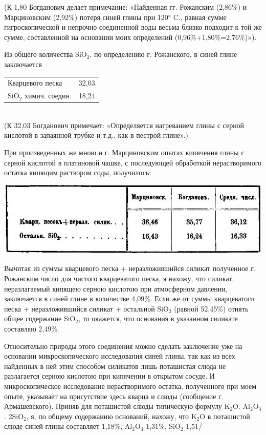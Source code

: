 (К 1,80 Богданович делает примечание: «Найденная гг. Рожанским (2,86\%) и Марциновским (2,92\%) потеря синей глины при 120° C., равная сумме гигроскопической и непрочно соединенной воды весьма близко подходит к той же сумме, составленной на основании моих определений (0,96\%+1,80\%=2,76\%)»).

Из общего количества SiO$_2$, по определению г. Рожанского, в синей глине заключается\\

\begin{tabular}{| l | l |}
\hline
Кварцевого песка & 32,03\\
SiO$_2$ химич. соедин. & 18,24 \\
\hline
\end{tabular}\\

(К 32,03 Богданович примечает: «Определяется нагреванием глины с серной кислотой в запаянной трубке и т.д., как в пестрой глине».)

При произведенных же мною и г. Марциновским опытах кипячения глины с серной кислотой в платиновой чашке, с последующей обработкой нерастворимого остатка кипящим раствором соды, получилось:\\

\begin{center}
\includegraphics[width=\linewidth]{pix/table-02.jpg}
\end{center} 

Вычитая из суммы кварцевого песка + неразложившийся силикат полученное г. Рожанским число для чистого кварцеватого песка, я нахожу, что силикат, неразлагаемый кипящею серною кислотою при атмосферном давлении, заключается в синей глине в количестве 4,09\%. Если же от суммы кварцеватого песка + неразложившийся силикат + остальной SiO$_2$ (равной 52,45\%) отнять общее содержание SiO$_2$, то окажется, что основания в указанном силикате составляю 2,49\%.

Относительно природы этого соединения можно сделать заключение уже на основании микроскопического исследования синей глины, так как из всех найденных в ней этим способом силикатов лишь поташистая слюда не разлагается серною кислотою при кипячении в открытом сосуде. И микроскопическое исследование нерастворимого остатка, полученного при моем опыте, указывает на присутствие здесь кварца и слюды (сообщение г. Армашевского). Приняв для поташистой слюды типическую формулу K$_2$O. Al$_2$O$_3$. 2SiO$_2$, я, по общему содержанию оснований, нахожу, что K$_2$O в поташистой слюде синей глины составляет 1,18\%, Al$_2$O$_3$ 1,31\%, SiO$_2$ 1,51/%

